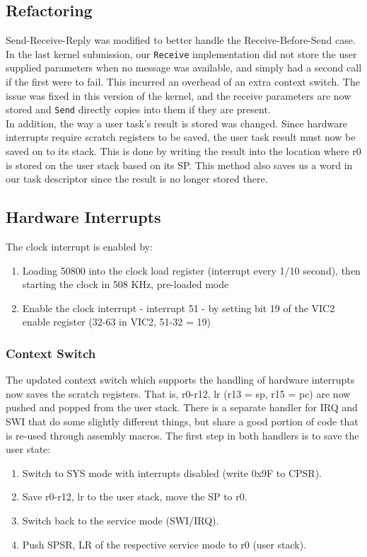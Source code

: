 \documentclass[12pt]{article}
\begin{document}
\subsection{Refactoring}
Send-Receive-Reply was modified to better handle the Receive-Before-Send case. In the last kernel submission, our \texttt{Receive} implementation did not store the user supplied parameters when no message was available, and simply had a second call if the first were to fail. This incurred an overhead of an extra context switch. The issue was fixed in this version of the kernel, and the receive parameters are now stored and \texttt{Send} directly copies into them if they are present.
\\
In addition, the way a user task's result is stored was changed. Since hardware interrupts require scratch registers to be saved, the user task result must now be saved on to its stack. This is done by writing the result into the location where r0 is stored on the user stack based on its SP. This method also saves us a word in our task descriptor since the result is no longer stored there.
\subsection{Hardware Interrupts}
The clock interrupt is enabled by:
\begin{enumerate}
    \item Loading 50800 into the clock load register (interrupt every 1/10 second), then starting the clock in 508 KHz, pre-loaded mode
    \item Enable the clock interrupt - interrupt 51 - by setting bit 19 of the VIC2 enable register (32-63 in VIC2, 51-32 = 19) \\
\end{enumerate}
\subsubsection{Context Switch}
The updated context switch which supports the handling of hardware interrupts now saves the scratch registers. That is, {r0-r12, lr} (r13 = sp, r15 = pc) are now pushed and popped from the user stack. There is a separate handler for IRQ and SWI that do some slightly different things, but share a good portion of code that is re-used through assembly macros. The first step in both handlers is to save the user state:
\begin{enumerate}
    \item Switch to SYS mode with interrupts disabled (write 0x9F to CPSR).
    \item Save {r0-r12, lr} to the user stack, move the SP to r0.
    \item Switch back to the service mode (SWI/IRQ).
    \item Push SPSR, LR of the respective service mode to r0 (user stack).
\end{enumerate}
\end{document}
